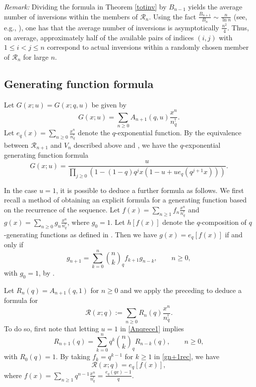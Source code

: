 \documentclass[11pt,a4paper]{article}
\begin{document}
\noindent \emph{Remark:} Dividing the formula in Theorem \ref{totinv} by $B_{n-1}$ yields the average number of inversions within the members of $\mathcal{R}_n$.  Using the fact $\frac{B_{n+1}}{B_n} \sim \frac{n}{\ln n}$  (see, e.g., \cite[Theorem 10]{RJ}), one has that the average number of inversions is asymptotically $\frac{n^2}{4}$.  Thus, on average, approximately half of the available pairs of indices $(i,j)$ with $1 \leq i < j \leq n$ correspond to actual inversions within a randomly chosen member of $\mathcal{R}_n$ for large $n$.


\subsection{Generating function formula}

Let $G(x;u)=G(x;q,u)$ be given by
$$G(x;u)=\sum_{n\geq0}A_{n+1}(q,u)\frac{x^n}{n_q^!}.$$
Let $e_q(x)=\sum_{n\geq0}\frac{x^n}{n_q^!}$ denote the $q$-exponential function.  By the equivalence between $\mathcal{R}_{n+1}$ and $V_n$ described above and \cite[Theorem 3.1]{QP}, we have the $q$-exponential generating function formula
\begin{equation}\label{Gxuform}
G(x;u)=\frac{u}{\prod_{j \geq0}\left(1-(1-q)q^jx(1-u+ue_q(q^{j+1}x))\right)}.
\end{equation}

In the case $u=1$, it is possible to deduce a further formula as follows.  We first recall a method of obtaining an explicit formula for a generating function based on the recurrence of the sequence.  Let $f(x)=\sum_{n\geq1}f_n\frac{x^n}{n_q^!}$ and $g(x)=\sum_{n\geq0}g_n\frac{x^n}{n_q^!}$, where $g_0=1$.  Let $h[f(x)]$ denote the $q$-composition of $q$-generating functions as defined in \cite[Definition 3.2]{Ges}.  Then we have $g(x)=e_q[f(x)]$ if and only if
\begin{equation}\label{gn+1rec}
g_{n+1}=\sum_{k=0}^n\binom{n}{k}_qf_{k+1}g_{n-k}, \qquad n \geq0,
\end{equation}
with $g_0=1$, by \cite[Proposition 3.4]{Ges}.

Let $R_n(q)=A_{n+1}(q,1)$ for $n\geq0$ and we apply the preceding to deduce a formula for
$$\mathcal{R}(x;q):=\sum_{n\geq0}R_n(q)\frac{x^n}{n_q^!}.$$
To do so, first note that letting $u=1$ in \eqref{Anqrece1} implies
$$R_{n+1}(q)=\sum_{k=0}^nq^k\binom{n}{k}_qR_{n-k}(q), \qquad n \geq0,$$
with $R_0(q)=1$.  By taking $f_k=q^{k-1}$ for $k\geq1$ in \eqref{gn+1rec}, we have
\begin{equation}\label{Rx;qform1}
\mathcal{R}(x;q)=e_q[f(x)],
\end{equation}
where $f(x)=\sum_{n\geq1}q^{n-1}\frac{x^n}{n_q^!}=\frac{e_q(qx)-1}{q}$.
\end{document}
